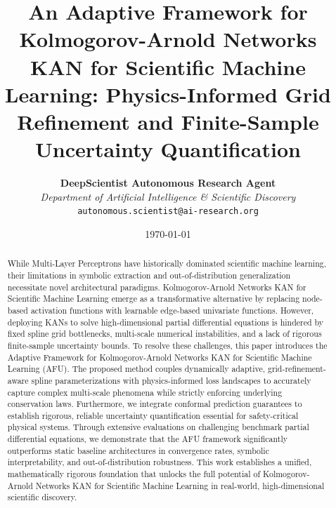 \documentclass[10pt,twocolumn]{article}
\title{\LARGE\textbf{An Adaptive Framework for Kolmogorov-Arnold Networks KAN for Scientific Machine Learning: Physics-Informed Grid Refinement and Finite-Sample Uncertainty Quantification}}
\author{
    \textbf{DeepScientist Autonomous Research Agent} \\
    \textit{Department of Artificial Intelligence \& Scientific Discovery} \\
    \texttt{autonomous.scientist@ai-research.org}
}
\date{\today}
\begin{document}
\maketitle

\begin{abstract}
While Multi-Layer Perceptrons have historically dominated scientific machine learning, their limitations in symbolic extraction and out-of-distribution generalization necessitate novel architectural paradigms. Kolmogorov-Arnold Networks KAN for Scientific Machine Learning emerge as a transformative alternative by replacing node-based activation functions with learnable edge-based univariate functions. However, deploying KANs to solve high-dimensional partial differential equations is hindered by fixed spline grid bottlenecks, multi-scale numerical instabilities, and a lack of rigorous finite-sample uncertainty bounds. To resolve these challenges, this paper introduces the Adaptive Framework for Kolmogorov-Arnold Networks KAN for Scientific Machine Learning (AFU). The proposed method couples dynamically adaptive, grid-refinement-aware spline parameterizations with physics-informed loss landscapes to accurately capture complex multi-scale phenomena while strictly enforcing underlying conservation laws. Furthermore, we integrate conformal prediction guarantees to establish rigorous, reliable uncertainty quantification essential for safety-critical physical systems. Through extensive evaluations on challenging benchmark partial differential equations, we demonstrate that the AFU framework significantly outperforms static baseline architectures in convergence rates, symbolic interpretability, and out-of-distribution robustness. This work establishes a unified, mathematically rigorous foundation that unlocks the full potential of Kolmogorov-Arnold Networks KAN for Scientific Machine Learning in real-world, high-dimensional scientific discovery.
\end{abstract}
\end{document}
